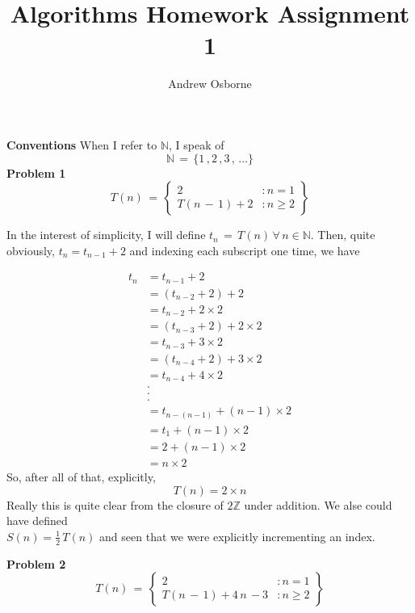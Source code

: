 \documentclass{article}
\title{Algorithms Homework Assignment 1}
\author{Andrew Osborne}
\begin{document}
  \maketitle
  \noindent \textbf{Conventions}
  When I refer to $\mathbb{N}$, I speak of $$\mathbb{N} \, = \, \{ 1\,,2\,,3\,,\,\dots \}$$
  \noindent \textbf{Problem 1} \newline
    $$
      T(n) \, = \, \left\{
      \begin{array}{lr}
        2 &: n = 1 \\
        T(n\,-\,1) +2 &: n \geq 2

      \end{array}
      \right\}
    $$

    In the interest of simplicity, I will define $t_n \, = \, T(n) \, \forall\, n \in \mathbb{N}$. Then, quite obviously, $ t_n = t_{n-1} + 2$ and indexing each subscript one time, we have

    \begin{equation}
      \begin{split}
        t_n & = t_{n-1} + 2 \\
        & = (t_{n-2} + 2) + 2 \\
        & = t_{n-2} + 2 \times 2 \\
        & = (t_{n-3} + 2) + 2 \times 2 \\
        & = t_{n-3} + 3 \times 2 \\
        & = (t_{n-4} + 2) + 3 \times 2 \\
        & = t_{n-4} + 4 \times 2 \\
        & . \\
        & . \\
        & . \\
        & = t_{n - (n-1)} + (n-1) \times 2 \\
        & = t_1 + (n-1)\times 2 \\
        & = 2 + (n-1) \times 2 \\
        & = n \times 2
      \end{split}
    \end{equation}
    So, after all of that, explicitly, $$ T(n) = 2 \times n$$
    Really this is quite clear from the closure of $2\mathbb{Z}$ under addition.
    We alse could have defined \\ $ S(n) = \frac{1}{2} \, T(n) $ and seen that we were explicitly incrementing an index.


  \noindent \textbf{Problem 2} \newline
    $$
      T(n) \, = \, \left\{
      \begin{array}{lr}
        2 &: n = 1 \\
        T(n\,-\,1) +4\,n\,-3 &: n \geq 2
      \end{array}
      \right\}
    $$
\end{document}
